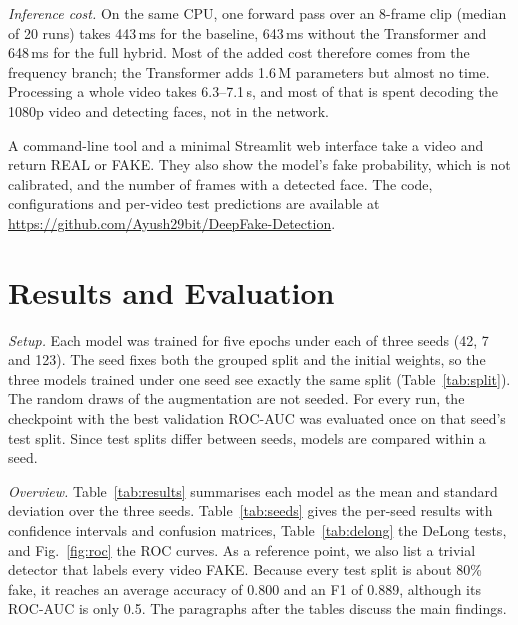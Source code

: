 \documentclass[conference]{IEEEtran}
\begin{document}
\textit{Inference cost.} On the same CPU, one forward pass over an 8-frame
clip (median of 20 runs) takes 443\,ms for the baseline, 643\,ms without the
Transformer and 648\,ms for the full hybrid. Most of the added cost therefore
comes from the frequency branch; the Transformer adds 1.6\,M parameters but
almost no time. Processing a whole video takes 6.3--7.1\,s, and most of that
is spent decoding the 1080p video and detecting faces, not in the network.

A command-line tool and a minimal Streamlit web interface take a video and
return REAL or FAKE. They also show the model's fake probability, which is
not calibrated, and the number of frames with a detected face. The code, configurations and per-video
test predictions are available at
\url{https://github.com/Ayush29bit/DeepFake-Detection}.

\section{Results and Evaluation}

\textit{Setup.} Each model was trained for five epochs under each of three
seeds (42, 7 and 123). The seed fixes both the grouped split and the initial
weights, so the three models trained under one seed see exactly the same
split (Table~\ref{tab:split}). The random draws of the augmentation are not
seeded. For every run, the checkpoint with the best validation ROC-AUC was
evaluated once on that seed's test split. Since test splits differ between
seeds, models are compared within a seed.

\textit{Overview.} Table~\ref{tab:results} summarises each model as the mean
and standard deviation over the three seeds. Table~\ref{tab:seeds} gives the
per-seed results with confidence intervals and confusion matrices,
Table~\ref{tab:delong} the DeLong tests, and Fig.~\ref{fig:roc} the ROC
curves. As a reference point, we also list a trivial detector that labels
every video FAKE. Because every test split is about 80\% fake, it reaches an
average accuracy of 0.800 and an F1 of 0.889, although its ROC-AUC is only
0.5. The paragraphs after the tables discuss the main findings.
\end{document}
